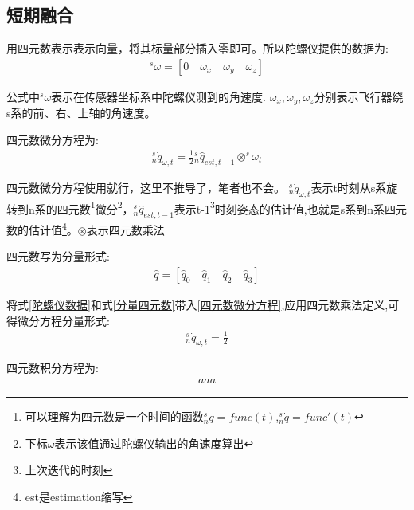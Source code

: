 \documentclass[12pt,a4paper]{article}
\begin{document}
\subsection{短期融合}
用四元数表示表示向量，将其标量部分插入零即可。所以陀螺仪提供的数据为:
\begin{eqnarray}
    ^s\omega=[0\quad\omega_{x}\quad\omega_{y}\quad\omega_{z}] \label{陀螺仪数据}
\end{eqnarray}

公式中$^s\omega$表示在传感器坐标系中陀螺仪测到的角速度.
$\omega_{x},\omega_{y},\omega_{z}$分别表示飞行器绕s系的前、右、上轴的角速度。

四元数微分方程为:
\begin{eqnarray}
    ^s_n\dot{q}_{\omega,t}=\frac{1}{2}{^s_n\hat{q}_{est,t-1}}\otimes^s\omega_t \label{四元数微分方程}
\end{eqnarray}

四元数微分方程使用就行，这里不推导了，笔者也不会。
$^s_n\dot{q}_{\omega,t}$表示t时刻从s系旋转到n系的四元数\footnote{可以理解为四元数是一个时间的函数$^s_n{q}=func(t)$,$^s_n\dot{q}=func'(t)$}微分\footnote{下标$\omega$表示该值通过陀螺仪输出的角速度算出}，${^s_n\hat{q}_{est,t-1}}$表示t-1\footnote{上次迭代的时刻}时刻姿态的估计值,也就是s系到n系四元数的估计值\footnote{est是estimation缩写}。$\otimes$表示四元数乘法

四元数写为分量形式:
\begin{eqnarray}
    \hat{q}=[\hat{q}_0\quad \hat{q}_1\quad \hat{q}_2\quad \hat{q}_3] \label{分量四元数}
\end{eqnarray}

将式\ref{陀螺仪数据}和式\ref{分量四元数}带入\ref{四元数微分方程},应用四元数乘法定义\cite{捷联惯导航},可得微分方程分量形式:
\begin{eqnarray}
    ^s_n\dot{q}_{\omega,t}=\frac{1}{2}
\end{eqnarray}

四元数积分方程为:
\begin{eqnarray}
    aaa \label{四元数积分方程}
\end{eqnarray}
\end{document}
